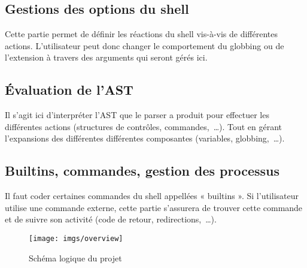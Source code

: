 \subsection{Gestions des options du shell}

Cette partie permet de définir les réactions du shell vis-à-vis de différentes
actions. L'utilisateur peut donc changer le comportement du globbing ou de
l'extension à travers des arguments qui seront gérés ici.

\subsection{Évaluation de l'AST}

Il s'agit ici d'interpréter l'AST que le parser a produit pour effectuer les
différentes actions (structures de contrôles, commandes,~\dots). Tout en gérant
l'expansions des différentes différentes composantes (variables,
globbing,~\dots).

\subsection{Builtins, commandes, gestion des processus}

Il faut coder certaines commandes du shell appellées « builtins ». Si
l'utilisateur utilise une commande externe, cette partie s'assurera de trouver
cette commande et de suivre son activité (code de retour, redirections,~\dots).

\begin{sidewaysfigure}[H]
    \texttt{[image: imgs/overview]}
    \caption{Schéma logique du projet}
\end{sidewaysfigure}
